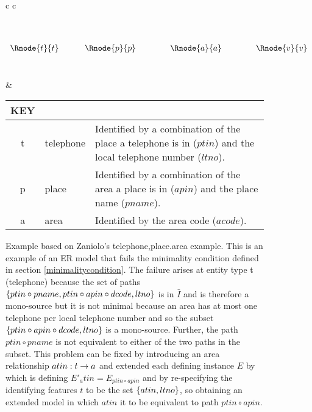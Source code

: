 \begin{figure} [h]
\begin{center}
\begin{tabular}{c c}
$
\begin{array}{cp{0.4cm}cp{0.75cm}cp{0.75cm}c}
              &&               &&                &&               \\[0.25cm]
              &&               &&                &&               \\[0.25cm]
\Rnode{t}{t}	&& \Rnode{p}{p}  &&   \Rnode{a}{a} && \Rnode{v}{v}  \\[0.25cm]
	            &&  
\end{array}
$

\idcomp
{}
\idcomp
{}
\idcomp
{}
\idcomp
{}
\idcomp
& \footnotesize
\begin{tabular}{c p{1.5cm} p{4cm}}
KEY && \\
\hline
t  & telephone       & Identified by a combination of the place a telephone is in ($ptin$) 
                      and the local telephone number ($ltno$). \\
p  & place           & Identified by a combination of the area a place is in ($apin$)
                         and the place name ($pname$). \\
a  & area            & Identified by the area code ($acode$).
\end{tabular} 
\end{tabular}
\end{center}
\caption{Example based on Zaniolo's telephone,place.area example. 
This is an example of an ER model that fails the minimality condition defined in section \ref{minimalitycondition}.
The failure arises at entity type t (telephone) because 
the set of paths $\left\{ptin\circ pname, ptin \circ apin \circ dcode, ltno\right\}$ is
in $\bar{I}$ and is therefore a mono-source but it is not minimal because
 an area has at most one telephone per local telephone number and so the 
subset $\left\{ptin \circ apin \circ dcode, ltno\right\}$ is  a
mono-source. Further, the path $ptin \circ pname$ is not equivalent to either of the two paths in the subset.
This problem can be fixed by introducing an area relationship $atin: t \rightarrow a$ and extended each defining instance $E$
 by which is defining $E'_atin=E_{ptin \circ apin}$  and by re-specifying the identifying features $t$ to be the set $\left\{atin,ltno\right\}$,
so obtaining an extended model in which $atin$ it to be equivalent to
path $ptin \circ apin$.
}
\label{clubpresidentbeforenormalisation}
\end{figure}